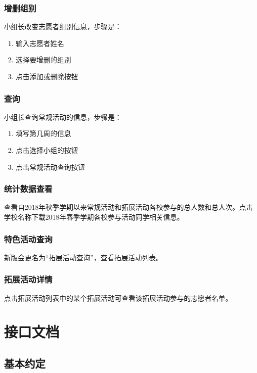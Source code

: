 \documentclass[]{ctexart}
\begin{document}
\subsubsection{增删组别}
小组长改变志愿者组别信息，步骤是：
\begin{enumerate}
\item 输入志愿者姓名
\item 选择要增删的组别
\item 点击添加或删除按钮
\end{enumerate}

\subsubsection{查询}
小组长查询常规活动的信息，步骤是：
\begin{enumerate}
\item 填写第几周的信息
\item 点击选择小组的按钮
\item 点击常规活动查询按钮
\end{enumerate}

\subsubsection{统计数据查看}
查看自2018年秋季学期以来常规活动和拓展活动各校参与的总人数和总人次。点击学校名称下载2018年春季学期各校参与活动同学相关信息。

\subsubsection{特色活动查询}
新版会更名为“拓展活动查询”，查看拓展活动列表。

\subsubsection{拓展活动详情}
点击拓展活动列表中的某个拓展活动可查看该拓展活动参与的志愿者名单。

\section{接口文档}\label{api}

\hypertarget{ux57faux672cux7ea6ux5b9a}{%
\subsection{基本约定}\label{ux57faux672cux7ea6ux5b9a}}
\end{document}
